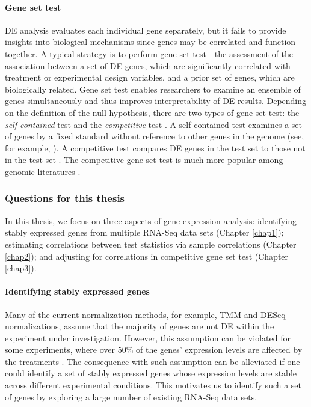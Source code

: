 \paragraph*{Gene set test}
DE analysis evaluates each individual gene separately, but it fails to provide insights into
biological mechanisms since genes may be correlated and function together.  A typical strategy is to
perform gene set test---the assessment of
the association between a set of DE genes, which are significantly correlated with
treatment or experimental design variables, and a prior set of genes, which are biologically
related. Gene set test enables
researchers to examine an ensemble of genes simultaneously and thus improves interpretability of DE
results. Depending on the definition of the null hypothesis, there are two types of gene set test:
the \textit{self-contained} test and the \textit{competitive} test \citep{goeman2007analyzing}. A
self-contained test examines a set of genes by a fixed standard without reference to other genes in
the genome (see, for example, \cite{goeman2004global,goeman2005testing, huang2013gene,
	tsai2009multivariate, wu2010roast}). A competitive test compares DE
genes in the test set to those not in the test set
\citep{tian2005discovering,wu2012camera,yaari2013quantitative}. The competitive gene set test is
much more popular among genomic literatures \citep{gatti2010heading,goeman2007analyzing}.  




\subsubsection{Questions for this thesis}
In this thesis, we focus on three aspects of gene expression analysis: identifying stably
expressed genes from multiple RNA-Seq data sets (Chapter \ref{chap1}); estimating correlations
between test statistics via sample
correlations (Chapter \ref{chap2}); and adjusting for correlations in competitive gene set test
(Chapter \ref{chap3}).

\paragraph{Identifying stably expressed genes}
Many of the current normalization methods, for example, TMM \citep{robinson2010scaling} and DESeq
\citep{anders2010differential} normalizations, assume that the majority of genes are not DE within
the experiment under investigation. However, this assumption can be violated for some experiments,
where over $50\%$ of the genes' expression levels are affected by the treatments
\citep{loven2012revisiting, wu2013use}. The consequence with such assumption can be alleviated if
one could identify a set of stably expressed genes whose expression levels are stable across
different experimental conditions. This motivates us to identify such a set of genes by exploring a
large number of existing RNA-Seq data sets.

